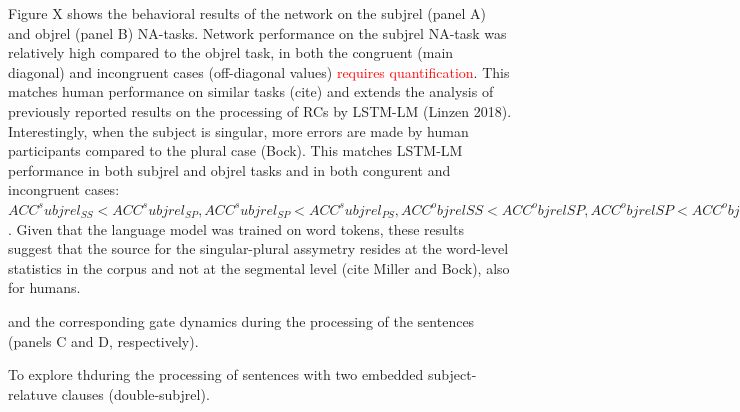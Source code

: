 Figure X shows the behavioral results of the network on the subjrel (panel A) and objrel (panel B) NA-tasks. Network performance on the subjrel NA-task was relatively high compared to the objrel task, in both the congruent (main diagonal) and incongruent cases (off-diagonal values) \textcolor{red}{requires quantification}. This matches human performance on similar tasks (cite) and extends the analysis of previously reported results on the processing of RCs by LSTM-LM (Linzen 2018). Interestingly, when the subject is singular, more errors are made by human participants compared to the plural case (Bock). This matches LSTM-LM performance in both subjrel and objrel tasks and in both congurent and incongruent cases: $ACC^subjrel_{SS}<ACC^subjrel_{SP}, ACC^subjrel_{SP}<ACC^subjrel_{PS}, ACC^objrel{SS}<ACC^objrel{SP}, ACC^objrel{SP}<ACC^objrel{PS}$. Given that the language model was trained on word tokens, these results suggest that the source for the singular-plural assymetry resides at the word-level statistics in the corpus and not at the segmental level (cite Miller and Bock), also for humans.

and the corresponding gate dynamics during the processing of the sentences (panels C and D, respectively).


To explore thduring the processing of sentences with two embedded subject-relatuve clauses (double-subjrel). 
